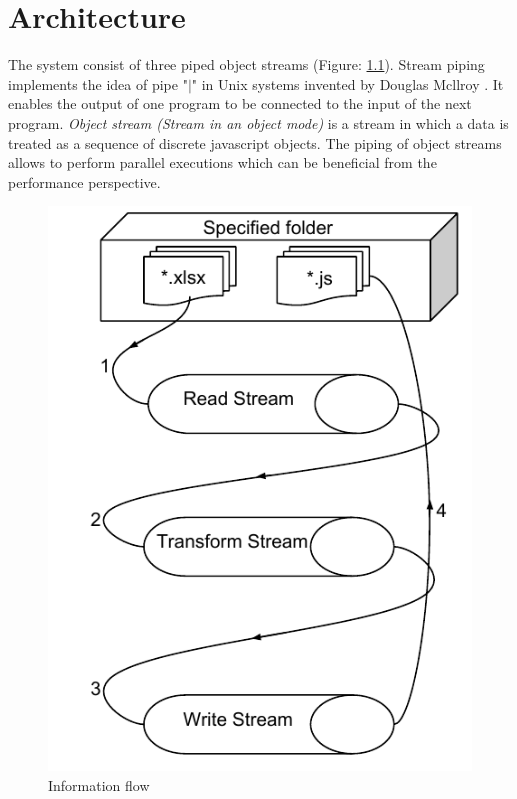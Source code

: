 \chapter{Architecture} 
\label{chap:architectureDesign}

The system consist of three piped object streams  (Figure: \ref{fig:tsGenArch}). Stream piping implements the idea of pipe "$|$" in Unix systems invented by Douglas Mcllroy \cite{pipe}. It enables the output of one program to be connected to the input of the next program. \textit{Object stream (Stream in an object mode)} is a stream in which a data is treated as a sequence of discrete javascript objects. The piping of object streams allows to perform parallel executions which can be beneficial from the performance perspective. 

\begin{figure}[ht]
	\label{fig:tsGenArch}
	\centering
	\includegraphics[scale=0.75]{grafiken/TSGeneratorArchitecture}
	\caption{Information flow}
\end{figure}

